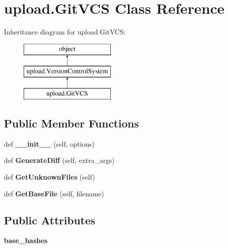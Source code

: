 \hypertarget{classupload_1_1_git_v_c_s}{}\section{upload.\+Git\+V\+CS Class Reference}
\label{classupload_1_1_git_v_c_s}
Inheritance diagram for upload.\+Git\+V\+CS\+:\begin{figure}[H]
\begin{center}
\leavevmode
\includegraphics[height=3.000000cm]{classupload_1_1_git_v_c_s}
\end{center}
\end{figure}
\subsection*{Public Member Functions}
\begin{DoxyCompactItemize}
\item 
\mbox{\label{classupload_1_1_git_v_c_s_aba4e1dca1c4b3e5db7ba07f6bce3c839}} 
def {\bfseries \+\_\+\+\_\+init\+\_\+\+\_\+} (self, options)
\item 
\mbox{\label{classupload_1_1_git_v_c_s_a3ebfc01cebc9b585706ad3f4389a8833}} 
def {\bfseries Generate\+Diff} (self, extra\+\_\+args)
\item 
\mbox{\label{classupload_1_1_git_v_c_s_ae4e8c0e9fa01619c6a5c76d1ab84b995}} 
def {\bfseries Get\+Unknown\+Files} (self)
\item 
\mbox{\label{classupload_1_1_git_v_c_s_a70ddb65a6b512b8cb8cc4affa37ff9b4}} 
def {\bfseries Get\+Base\+File} (self, filename)
\end{DoxyCompactItemize}
\subsection*{Public Attributes}
\begin{DoxyCompactItemize}
\item 
\mbox{\label{classupload_1_1_git_v_c_s_a07e9469050a157f34fe804cdf6ecddac}} 
{\bfseries base\+\_\+hashes}
\end{DoxyCompactItemize}


